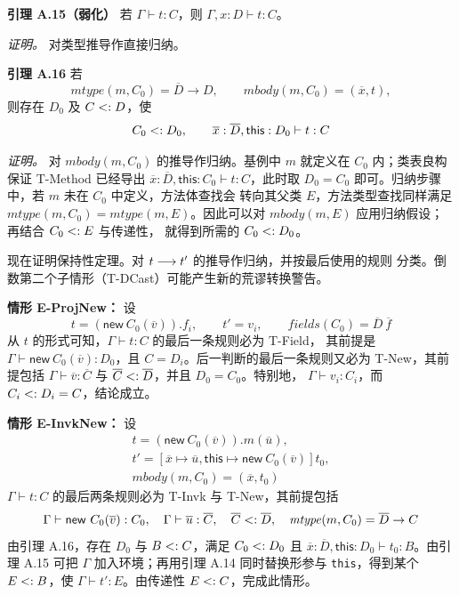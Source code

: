 \begin{taplauthorsolutionentrybox}
\medskip
\textbf{引理 A.15（弱化）}
若 \(\Gamma\vdash t:C\)，则 \(\Gamma,x:D\vdash t:C\)。

\textit{证明。} 对类型推导作直接归纳。

\medskip
\textbf{引理 A.16}
若
\[
 \mathit{mtype}(m,C_0)=\overline D\to D,
 \qquad
 \mathit{mbody}(m,C_0)=(\overline x,t),
\]
则存在 \(D_0\) 及 \(C\mathrel{<:} D\)，使
\[
 C_0\mathrel{<:} D_0,
 \qquad
 \overline x:\overline D,\mathsf{this}:D_0\vdash t:C
\]

\textit{证明。}
对 \(\mathit{mbody}(m,C_0)\) 的推导作归纳。基例中 \(m\) 就定义在
\(C_0\) 内；类表良构保证 T-Method 已经导出
\(\overline x:\overline D,\mathsf{this}:C_0\vdash t:C\)，此时取
\(D_0=C_0\) 即可。归纳步骤中，若 \(m\) 未在 \(C_0\) 中定义，方法体查找会
转向其父类 \(E\)，方法类型查找同样满足
\(\mathit{mtype}(m,C_0)=\mathit{mtype}(m,E)\)。因此可以对
\(\mathit{mbody}(m,E)\) 应用归纳假设；再结合 \(C_0\mathrel{<:} E\) 与传递性，
就得到所需的 \(C_0\mathrel{<:} D_0\)。

现在证明保持性定理。对 \(t\mathrel{\longrightarrow} t'\) 的推导作归纳，并按最后使用的规则
分类。倒数第二个子情形（T-DCast）可能产生新的荒谬转换警告。

\textbf{情形 E-ProjNew：}
设
\[
 t=(\mathsf{new}\ C_0(\overline v)).f_i,
 \qquad t'=v_i,
 \qquad \mathit{fields}(C_0)=\overline D\ \overline f
\]
从 \(t\) 的形式可知，\(\Gamma\vdash t:C\) 的最后一条规则必为 T-Field，
其前提是
\(\Gamma\vdash\mathsf{new}\ C_0(\overline v):D_0\)，且
\(C=D_i\)。后一判断的最后一条规则又必为 T-New，其前提包括
\(\Gamma\vdash\overline v:\overline C\) 与
\(\overline C\mathrel{<:}\overline D\)，并且 \(D_0=C_0\)。特别地，
\(\Gamma\vdash v_i:C_i\)，而 \(C_i\mathrel{<:} D_i=C\)，结论成立。

\textbf{情形 E-InvkNew：}
设
\[
\begin{gathered}
 t=(\mathsf{new}\ C_0(\overline v)).m(\overline u),\\
 t'=[\overline x\mapsto\overline u,
     \mathsf{this}\mapsto\mathsf{new}\ C_0(\overline v)]t_0,\\
 \mathit{mbody}(m,C_0)=(\overline x,t_0)
\end{gathered}
\]
\(\Gamma\vdash t:C\) 的最后两条规则必为 T-Invk 与 T-New，其前提包括
\[
 \Gamma\vdash\mathsf{new}\ C_0(\overline v):C_0,
 \quad
 \Gamma\vdash\overline u:\overline C,
 \quad
 \overline C\mathrel{<:}\overline D,
 \quad
 \mathit{mtype}(m,C_0)=\overline D\to C
\]
由引理 A.16，存在 \(D_0\) 与 \(B\mathrel{<:} C\)，满足
\(C_0\mathrel{<:} D_0\) 且
\(\overline x:\overline D,\mathsf{this}:D_0\vdash t_0:B\)。由引理 A.15
可把 \(\Gamma\) 加入环境；再用引理 A.14 同时替换形参与
\texttt{this}，得到某个 \(E\mathrel{<:} B\)，使
\(\Gamma\vdash t':E\)。由传递性 \(E\mathrel{<:} C\)，完成此情形。


\end{taplauthorsolutionentrybox}
